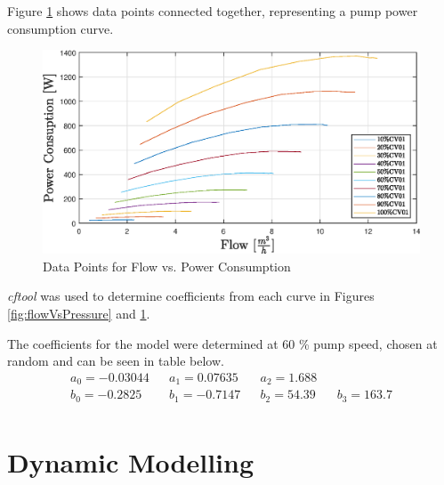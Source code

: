 \newpage
Figure \ref{fig:flowVsPowerConsumption} shows data points connected together, representing a pump
power consumption curve.

\begin{figure}[ht]
	\centering
	\includegraphics[width=1\textwidth]{figures/05mathematicalModelling/flowVsPowerRun34.eps}
	\caption{Data Points for Flow vs. Power Consumption}
	\label{fig:flowVsPowerConsumption}
\end{figure}

\textit{cftool} was used to determine coefficients  from each curve in  Figures \ref{fig:flowVsPressure} and \ref{fig:flowVsPowerConsumption}.

The coefficients for the model were determined at 60 \% pump speed, chosen at random and can be seen in
table below.
\begin{align*}
	a_0 = -0.03044 && a_1 = 0.07635  && a_2 = 1.688  \\
	b_0 = -0.2825 && b_1 = -0.7147 && b_2 = 54.39 && b_3 = 163.7 \\
\end{align*}

\section{Dynamic Modelling}


